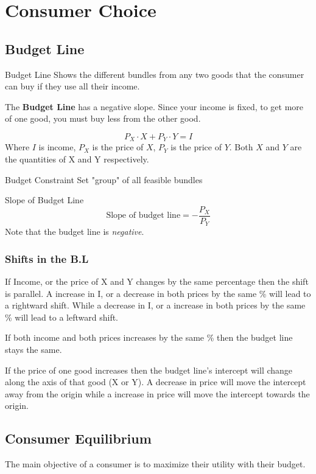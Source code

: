 \documentclass[../ECON-281-Notes.tex]{subfiles}
\begin{document}
\chapter{Consumer Choice}

\section{Budget Line}
\begin{Definition}
    {Budget Line}
    Shows the different bundles from any two goods that the consumer can buy if they use all their income.

    The \textbf{Budget Line} has a negative slope. Since your income is fixed, to get more of one good, you must buy less from the other good.

    \[P_X \cdot X + P_Y \cdot Y = I\]
    Where \(I\) is income, \(P_X\) is the price of \(X\), \(P_Y\) is the price of \(Y\). Both \(X\) and \(Y\) are the quantities of X and Y respectively. 
\end{Definition}

\begin{Definition}
    {Budget Constraint}
    Set "group" of all feasible bundles
\end{Definition}

\begin{Definition}
    {Slope of Budget Line}
    \[\text{Slope of budget line} =  -\frac{P_X}{P_Y}\]
    Note that the budget line is \emph{negative}.
\end{Definition}

\subsection{Shifts in the B.L}
If Income, or the price of X and Y changes by the same percentage then the shift is parallel. A increase in I, or a decrease in both prices by the same \% will lead to a rightward shift. While a decrease in I, or a increase in both prices by the same \% will lead to a leftward shift.

If both income and both prices increases by the same \% then the budget line stays the same. 

If the price of one good increases then the budget line's intercept will change along the axis of that good (X or Y). A decrease in price will move the intercept away from the origin while a increase in price will move the intercept towards the origin.

\section{Consumer Equilibrium}
The main objective of a consumer is to maximize their utility with their budget. 
\end{document}
